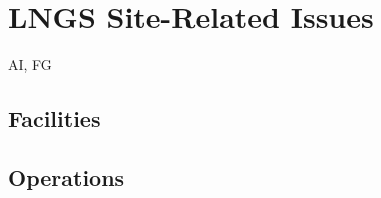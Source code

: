 \section{LNGS Site-Related Issues}
\label{sec:Site}

AI, FG


\subsection{Facilities}
\label{sec:Site-Facilities}


\subsection{Operations}
\label{sec:Site-Operations}

